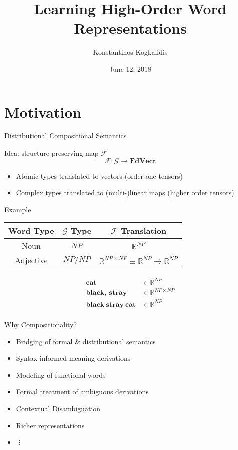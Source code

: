 \documentclass{beamer}
\title{Learning High-Order Word Representations}
\date{June 12, 2018}
\author{Konstantinos Kogkalidis}
\institute{LoLa Fan Club}
\begin{document}
  \maketitle
 
\section{Motivation}
\begin{frame}{Distributional Compositional Semantics}

	Idea: structure-preserving map $\mathcal{F}$
	\[
	\mathcal{F}: \mathcal{G} \to \pmb{FdVect} 
	\]
	
	\begin{itemize}	
	\item Atomic types translated to vectors (order-one tensors)
	\item Complex types translated to (multi-)linear maps (higher order tensors)
	\end{itemize}
\end{frame}

\begin{frame}{Example}
\centering

	\vspace{40pt}
	\begin{tabular}{c|c|c}
	\toprule
	Word Type & $\mathcal{G}$ Type & $\mathcal{F}$ Translation\\
	\midrule
	Noun & $NP$ & $\mathbb{R}^{NP}$ \\ 
	Adjective & $NP / NP$ & $\mathbb{R}^{NP \times NP} \equiv \mathbb{R}^{NP} \to \mathbb{R}^{NP}$\\
	\end{tabular}
	
	\vspace{20pt}
	\begin{align*}
	\pmb{cat} & \in \mathbb{R}^{NP}\\
	\pmb{black},\ \pmb{stray} & \in \mathbb{R}^{NP \times NP}\\
	\pmb{black\ stray\ cat} & \in \mathbb{R}^{NP}\\
	\end{align*}	
	
\end{frame}
  
\begin{frame}{Why Compositionality?}
	\begin{itemize}
	\item Bridging of formal \& distributional semantics
	\item Syntax-informed meaning derivations
	\item Modeling of functional words
	\item Formal treatment of ambiguous derivations
	\item Contextual Disambiguation
	\item Richer representations
	\item[] \quad \vdots
	\end{itemize}
\end{frame}
\end{document}
